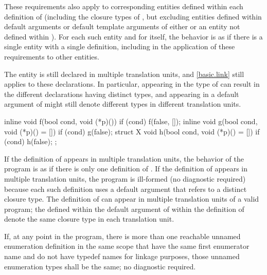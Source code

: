 \pnum
These requirements also apply to corresponding entities
defined within each definition of 
(including the closure types of ,
but excluding entities defined within default arguments or
default template arguments of either  or
an entity not defined within ).
For each such entity and for  itself,
the behavior is as if there is a single entity with a single definition,
including in the application of these requirements to other entities.
\begin{note}
The entity is still declared in multiple translation units, and \ref{basic.link}
still applies to these declarations. In particular,
appearing in the type of  can result
in the different declarations having distinct types, and
 appearing in a default argument of 
might still denote different types in different translation units.
\end{note}

\pnum
\begin{example}
\begin{codeblock}
inline void f(bool cond, void (*p)()) {
  if (cond) f(false, []{});
}
inline void g(bool cond, void (*p)() = []{}) {
  if (cond) g(false);
}
struct X {
  void h(bool cond, void (*p)() = []{}) {
    if (cond) h(false);
  }
};
\end{codeblock}

If the definition of  appears in multiple translation units,
the behavior of the program is as if
there is only one definition of .
If the definition of  appears in multiple translation units,
the program is ill-formed (no diagnostic required) because
each such definition uses a default argument that
refers to a distinct  closure type.
The definition of  can appear
in multiple translation units of a valid program;
the  defined within
the default argument of  within the definition of 
denote the same closure type in each translation unit.
\end{example}

\pnum
If, at any point in the program,
there is more than one
reachable unnamed enumeration definition in the same scope
that have the same first enumerator name and
do not have typedef names for linkage purposes,
those unnamed enumeration types shall be the same; no diagnostic required.

